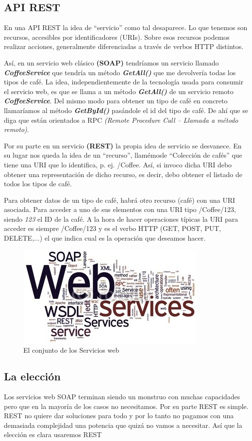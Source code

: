 \subsection{API REST}
En una API REST la idea de “servicio” como tal desaparece. Lo que tenemos son recursos, accesibles por identificadores (URIs). Sobre esos recursos podemos realizar acciones, generalmente diferenciadas a través de verbos HTTP distintos. 

Así, en un servicio web clásico \textbf{(SOAP)} tendríamos un servicio llamado \textbf{\textit{CoffeeService}} que tendría un método \textit{\textbf{GetAll()}} que me devolvería todas los tipos de café. La idea, independientemente de la tecnología usada para consumir el servicio web, es que se llama a un método \textit{\textbf{GetAll()}} de un servicio remoto \textbf{\textit{CoffeeService}}. Del mismo modo para obtener un tipo de café en concreto llamaríamos al método \textit{\textbf{GetById()}} pasándole el id del tipo de café. De ahí que se diga que están orientados a RPC \textit{(Remote Procedure Call – Llamada a método remoto)}. 

Por su parte en un servicio \textbf{(REST)} la propia idea de servicio se desvanece. En su lugar nos queda la idea de un “recurso”, llamémosle “Colección de cafés” que tiene una URI que lo identifica, p. ej. /Coffee. Así, si invoco dicha URI debo obtener una representación de dicho recurso, es decir, debo obtener el listado de todos los tipos de café. 

Para obtener datos de un tipo de café, habrá otro recurso (café) con una URI asociada. Para acceder a uno de sus elementos con una URI tipo /Coffee/123, siendo \textit{123} el ID de la café. 
A la hora de hacer operaciones típicas la URI para acceder es siempre  /Coffee/123 y es el verbo HTTP (GET, POST, PUT, DELETE,...) el que indica cual es la operación que deseamos hacer. 
\begin{figure}[H]
	\centering
	\includegraphics[width=0.5\linewidth]{figuras/webservice}
	\caption{El conjunto de los Servicios web} 
	\label{fig:webservice}
\end{figure}

\subsection{La elección}
Los servicios web SOAP terminan siendo un monstruo con muchas capacidades pero que en la mayoría de los casos no necesitamos. Por su parte REST es simple. REST no quiere dar soluciones para todo y por lo tanto no pagamos con una demasiada complejidad una potencia que quizá no vamos a necesitar. Así que la elección es clara usaremos REST


